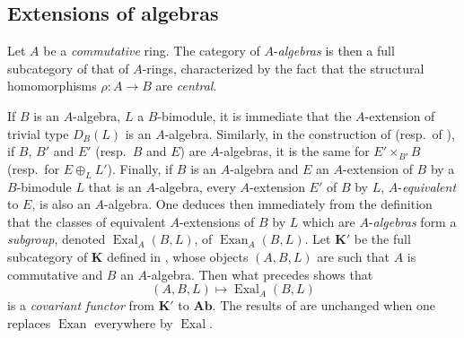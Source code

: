 \subsection{Extensions of algebras}
\label{subsection:0.18.4}

\begin{env}[18.4.1]
\label{0.18.4.1}
Let $A$ be a \emph{commutative} ring.
The category of $A$-\emph{algebras} is then a full subcategory of that of $A$-rings, characterized by the fact that the structural homomorphisms $\rho:A\to B$ are \emph{central}.

If $B$ is an $A$-algebra, $L$ a $B$-bimodule, it is immediate that the $A$-extension of trivial type $D_B(L)$ is an $A$-algebra.
Similarly, in the construction of  (resp.\ of ), if $B$, $B'$ and $E'$ (resp.\ $B$ and $E$) are $A$-algebras, it is the same for $E'\times_{B'} B$ (resp.\ for $E\oplus_L L'$).
Finally, if $B$ is an $A$-algebra and $E$ an $A$-extension of $B$ by a $B$-bimodule $L$ that is an $A$-algebra, every $A$-extension $E'$ of $B$ by $L$, $A$-\emph{equivalent} to $E$, is also an $A$-algebra.
One deduces then immediately from the definition  that the classes of equivalent $A$-extensions of $B$ by $L$ which are $A$-\emph{algebras} form a \emph{subgroup}, denoted $\operatorname{Exal}_A(B,L)$, of $\operatorname{Exan}_A(B,L)$.
Let $\boldsymbol{K}'$ be the full subcategory of $\boldsymbol{K}$ defined in , whose objects $(A,B,L)$ are such that $A$ is commutative and $B$ an $A$-algebra.
Then what precedes shows that
\[
  (A,B,L)\mapsto\operatorname{Exal}_A(B,L)
\]
is a \emph{covariant functor} from $\boldsymbol{K}'$ to $\boldsymbol{Ab}$.
The results of  are unchanged when one replaces $\operatorname{Exan}$ everywhere by $\operatorname{Exal}$.
\end{env}

